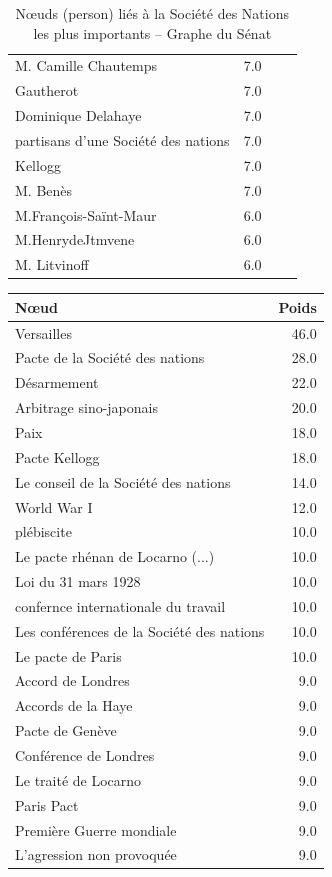\documentclass[a4paper,twoside,12pt]{book}
\begin{document}
\begin{table}[htbp]
\begin{tabular}{ll@{\hskip 1cm}ll}
M. Camille Chautemps & 7.0 \\
Gautherot & 7.0 \\
Dominique Delahaye & 7.0 \\
partisans d'une Société des nations & 7.0 \\
Kellogg & 7.0 \\
M. Benès & 7.0 \\
M.François-Saïnt-Maur & 6.0 \\
M.HenrydeJtmvene & 6.0 \\
M. Litvinoff & 6.0 \\
\hline
\end{tabular}
\caption{Nœuds (person) liés à la Société des Nations les plus importants – Graphe du Sénat}
\end{table}


\begin{table}[htbp]
\centering
\begin{tabular}{p{8cm}r}
\hline
\textbf{Nœud} &  \textbf{Poids} \\
\hline
Versailles & 46.0 \\
Pacte de la Société des nations & 28.0 \\
Désarmement & 22.0 \\
Arbitrage sino-japonais & 20.0 \\
Paix & 18.0 \\
Pacte Kellogg & 18.0 \\
Le conseil de la Société des nations & 14.0 \\
World War I & 12.0 \\
plébiscite & 10.0 \\
Le pacte rhénan de Locarno (...) & 10.0 \\
Loi du 31 mars 1928 & 10.0 \\
confernce internationale du travail & 10.0 \\
Les conférences de la Société des nations & 10.0 \\
Le pacte de Paris & 10.0 \\
Accord de Londres & 9.0 \\
Accords de la Haye & 9.0 \\
Pacte de Genève & 9.0 \\
Conférence de Londres & 9.0 \\
Le traité de Locarno & 9.0 \\
Paris Pact & 9.0 \\
Première Guerre mondiale & 9.0 \\
L'agression non provoquée & 9.0 \\

\end{tabular}
\end{table}
\end{document}
